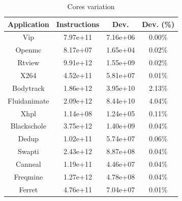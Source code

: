 \begin{table}[H]
	\caption{Cores variation}
	\begin{tabular}{|c|c|c|c|}
		\hline
		Application  & Instructions & Dev.     & Dev. (\%) \\ \hline
		Vip          & 7.97e+11     & 7.16e+06 & 0.00\%    \\ \hline
		Openmc       & 8.17e+07     & 1.65e+04 & 0.02\%    \\ \hline
		Rtview       & 9.91e+12     & 1.55e+09 & 0.02\%    \\ \hline
		X264         & 4.52e+11     & 5.81e+07 & 0.01\%    \\ \hline
		Bodytrack    & 1.86e+12     & 3.95e+10 & 2.13\%    \\ \hline
		Fluidanimate & 2.09e+12     & 8.44e+10 & 4.04\%    \\ \hline
		Xhpl         & 1.14e+08     & 1.24e+05 & 0.11\%    \\ \hline
		Blackschole  & 3.75e+12     & 1.40e+09 & 0.04\%    \\ \hline
		Dedup        & 1.02e+11     & 5.74e+07 & 0.06\%    \\ \hline
		Swapti       & 2.43e+12     & 8.87e+08 & 0.04\%    \\ \hline
		Canneal      & 1.19e+11     & 4.46e+07 & 0.04\%    \\ \hline
		Freqmine     & 1.27e+12     & 4.78e+08 & 0.04\%    \\ \hline
		Ferret       & 4.76e+11     & 7.04e+07 & 0.01\%    \\ \hline
	\end{tabular}
\end{table}

